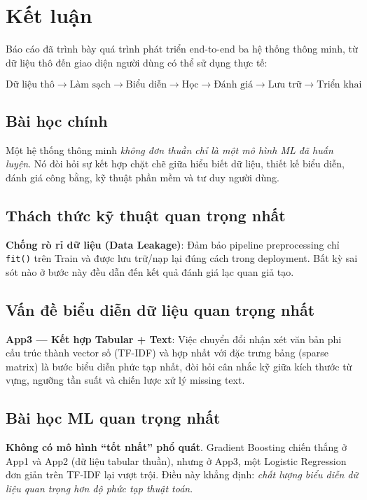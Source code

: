 \documentclass[12pt, a4paper]{article}
\begin{document}
\section{Kết luận}

Báo cáo đã trình bày quá trình phát triển end-to-end ba hệ thống thông minh, từ dữ liệu thô đến giao diện người dùng có thể sử dụng thực tế:

$$\text{Dữ liệu thô} \to \text{Làm sạch} \to \text{Biểu diễn} \to \text{Học} \to \text{Đánh giá} \to \text{Lưu trữ} \to \text{Triển khai}$$

\subsection{Bài học chính}

Một hệ thống thông minh \textit{không đơn thuần chỉ là một mô hình ML đã huấn luyện}. Nó đòi hỏi sự kết hợp chặt chẽ giữa hiểu biết dữ liệu, thiết kế biểu diễn, đánh giá công bằng, kỹ thuật phần mềm và tư duy người dùng.

\subsection{Thách thức kỹ thuật quan trọng nhất}

\textbf{Chống rò rỉ dữ liệu (Data Leakage)}: Đảm bảo pipeline preprocessing chỉ \texttt{fit()} trên Train và được lưu trữ/nạp lại đúng cách trong deployment. Bất kỳ sai sót nào ở bước này đều dẫn đến kết quả đánh giá lạc quan giả tạo.

\subsection{Vấn đề biểu diễn dữ liệu quan trọng nhất}

\textbf{App3 — Kết hợp Tabular + Text}: Việc chuyển đổi nhận xét văn bản phi cấu trúc thành vector số (TF-IDF) và hợp nhất với đặc trưng bảng (sparse matrix) là bước biểu diễn phức tạp nhất, đòi hỏi cân nhắc kỹ giữa kích thước từ vựng, ngưỡng tần suất và chiến lược xử lý missing text.

\subsection{Bài học ML quan trọng nhất}

\textbf{Không có mô hình ``tốt nhất'' phổ quát}. Gradient Boosting chiến thắng ở App1 và App2 (dữ liệu tabular thuần), nhưng ở App3, một Logistic Regression đơn giản trên TF-IDF lại vượt trội. Điều này khẳng định: \textit{chất lượng biểu diễn dữ liệu quan trọng hơn độ phức tạp thuật toán}.
\end{document}
